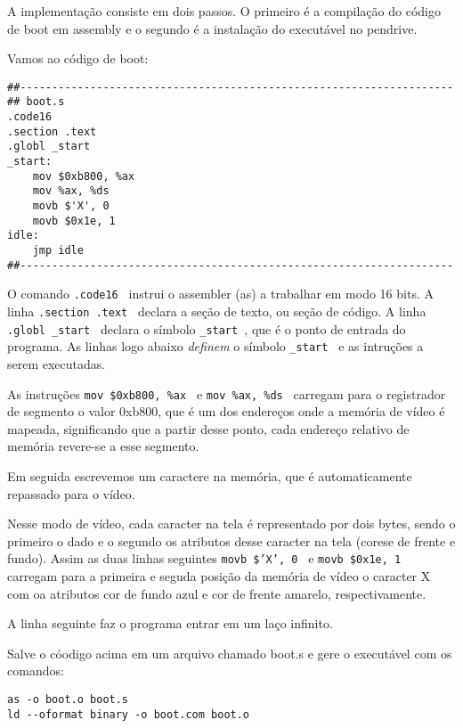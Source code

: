 A implementação consiste em dois passos. O primeiro é a compilação do código de boot em assembly e o segundo é a instalação do executável no pendrive.

Vamos ao código de boot:

\begin{espacosimples}
\begin{verbatim}
##--------------------------------------------------------------------
## boot.s
.code16
.section .text
.globl _start
_start:
    mov $0xb800, %ax
    mov %ax, %ds
    movb $'X', 0
    movb $0x1e, 1
idle:
    jmp idle
##--------------------------------------------------------------------
\end{verbatim}
\end{espacosimples}

O comando \texttt{.code16 } instrui o assembler (as) a trabalhar em modo 16 bits. A linha \texttt{.section .text } declara a seção de texto, ou seção de código. A linha \texttt{.globl \_{}start } declara o símbolo \texttt{\_{}start }, que é o ponto de entrada do programa. As linhas logo abaixo \emph{definem} o símbolo \texttt{\_{}start } e as intruções a serem executadas.

As instruções \texttt{mov \$0xb800, \%ax } e \texttt{mov \%ax, \%ds } carregam para o registrador de segmento o valor 0xb800, que é um dos endereços onde a memória de vídeo é mapeada, significando que a partir desse ponto, cada endereço relativo de memória revere-se a esse segmento.

Em seguida escrevemos um caractere na memória, que é automaticamente repassado para o vídeo.

Nesse modo de vídeo, cada caracter na tela é representado por dois bytes, sendo o primeiro o dado e o segundo os atributos desse caracter na tela (corese de frente e fundo). Assim as duas linhas seguintes \texttt{movb \$'X', 0 } e \texttt{movb \$0x1e, 1 } carregam para a primeira e seguda posição da memória de vídeo o caracter X com oa atributos cor de fundo azul e cor de frente amarelo, respectivamente.

A linha seguinte faz o programa entrar em um laço infinito.

Salve o cóodigo acima em um arquivo chamado boot.s e gere o executável com os comandos:

\begin{espacosimples}
\begin{verbatim}
as -o boot.o boot.s
ld --oformat binary -o boot.com boot.o
\end{verbatim}
\end{espacosimples}

